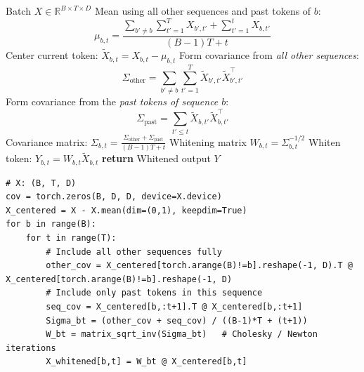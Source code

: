 \begin{algorithm}[tb]
    \caption{Sequential CBW}
    \label{alg:cbw_sequential}
    \begin{algorithmic}
        \REQUIRE Batch $X \in \mathbb{R}^{B \times T \times D}$
                \STATE Mean using all other sequences and past tokens of $b$:
                \[
                    \mu_{b,t} = \frac{
                        \sum_{b' \neq b} \sum_{t'=1}^{T} X_{b',t'} +
                        \sum_{t'=1}^{t} X_{b,t'}
                    }{(B-1)T + t}
                \]
                \STATE Center current token:
                $
                    \tilde{X}_{b,t} = X_{b,t} - \mu_{b,t}
                $
                \STATE Form covariance from \emph{all other sequences}:
                \[
                    \Sigma_{\text{other}} = \sum_{b' \neq b} \sum_{t'=1}^{T} 
                        \tilde{X}_{b',t'} \tilde{X}_{b',t'}^\top
                \]
                \STATE Form covariance from the \emph{past tokens of sequence $b$}:
                \[
                    \Sigma_{\text{past}} = \sum_{t' \le t} 
                        \tilde{X}_{b,t'} \tilde{X}_{b,t'}^\top
                \]
                \STATE Covariance matrix:
                $
                    \Sigma_{b,t} = \frac{\Sigma_{\text{other}} + \Sigma_{\text{past}}}
                                         {(B-1)T + t}
                $
                \STATE Whitening matrix $W_{b,t} = \Sigma_{b,t}^{-1/2}$ 
                \STATE Whiten token: $Y_{b,t} = W_{b,t} \tilde{X}_{b,t}$
            \ENDFOR
        \ENDFOR
        \STATE \textbf{return} Whitened output $Y$
    \end{algorithmic}
\end{algorithm}



\iffalse

\begin{lstlisting}[caption={Causal Batch Whitening (Sequential)}]
# X: (B, T, D)
cov = torch.zeros(B, D, D, device=X.device)
X_centered = X - X.mean(dim=(0,1), keepdim=True)
for b in range(B):
    for t in range(T):
        # Include all other sequences fully
        other_cov = X_centered[torch.arange(B)!=b].reshape(-1, D).T @ X_centered[torch.arange(B)!=b].reshape(-1, D)
        # Include only past tokens in this sequence
        seq_cov = X_centered[b,:t+1].T @ X_centered[b,:t+1]
        Sigma_bt = (other_cov + seq_cov) / ((B-1)*T + (t+1))
        W_bt = matrix_sqrt_inv(Sigma_bt)   # Cholesky / Newton iterations
        X_whitened[b,t] = W_bt @ X_centered[b,t]
\end{lstlisting}

